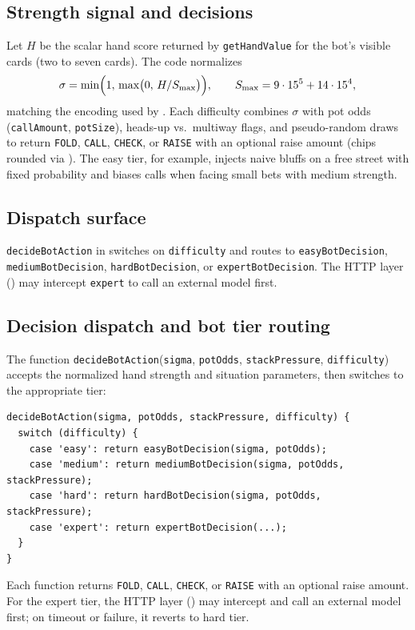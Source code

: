 \documentclass[11pt,a4paper]{article}
\begin{document}
\subsection{Strength signal and decisions}

Let $H$ be the scalar hand score returned by \texttt{getHandValue} for the bot's visible cards (two to seven cards). The code normalizes
\[
\sigma = \min\Bigl(1,\,\max\bigl(0,\, H/S_{\max}\bigr)\Bigr),
\qquad
S_{\max} = 9\cdot 15^{5} + 14\cdot 15^{4},
\]
matching the encoding used by . Each difficulty combines $\sigma$ with pot odds (\texttt{callAmount}, \texttt{potSize}), heads-up vs.\ multiway flags, and pseudo-random draws to return \texttt{FOLD}, \texttt{CALL}, \texttt{CHECK}, or \texttt{RAISE} with an optional raise amount (chips rounded via ). The easy tier, for example, injects naive bluffs on a free street with fixed probability and biases calls when facing small bets with medium strength.

\subsection{Dispatch surface}

\texttt{decideBotAction} in  switches on \texttt{difficulty} and routes to \texttt{easyBotDecision}, \texttt{mediumBotDecision}, \texttt{hardBotDecision}, or \texttt{expertBotDecision}. The HTTP layer () may intercept \texttt{expert} to call an external model first.

\subsection{Decision dispatch and bot tier routing}

The function \texttt{decideBotAction}(\texttt{sigma}, \texttt{potOdds}, \texttt{stackPressure}, \texttt{difficulty}) accepts the normalized hand strength and situation parameters, then switches to the appropriate tier:
\begin{verbatim}
decideBotAction(sigma, potOdds, stackPressure, difficulty) {
  switch (difficulty) {
    case 'easy': return easyBotDecision(sigma, potOdds);
    case 'medium': return mediumBotDecision(sigma, potOdds, stackPressure);
    case 'hard': return hardBotDecision(sigma, potOdds, stackPressure);
    case 'expert': return expertBotDecision(...);
  }
}
\end{verbatim}
Each function returns \texttt{FOLD}, \texttt{CALL}, \texttt{CHECK}, or \texttt{RAISE} with an optional raise amount. For the expert tier, the HTTP layer () may intercept and call an external model first; on timeout or failure, it reverts to hard tier.
\end{document}

